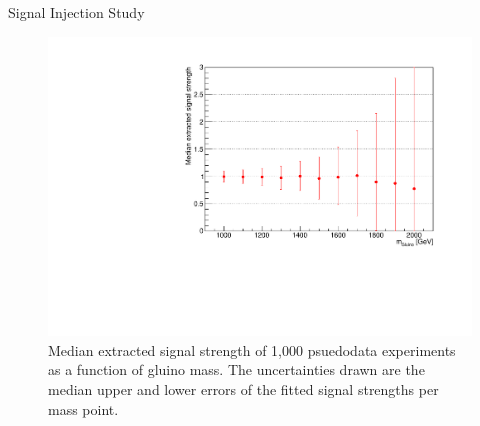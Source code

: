 \begin{section}{Signal Injection Study}
\begin{figure}[tbp!]
\centering
\includegraphics[angle=0,width=0.80\columnwidth]{fig/sig_injection.pdf}
\caption{Median extracted signal strength of 1,000 psuedodata experiments as a function of gluino mass.
The uncertainties drawn are the median upper and lower errors of the fitted signal strengths per mass point.}
\label{fig:sig_injection}
\end{figure}


\end{section}
